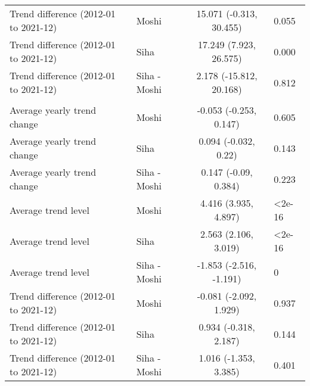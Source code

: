 \begin{longtable}{l|lcl}
Trend difference (2012-01 to 2021-12) & Moshi & 15.071 (-0.313, 30.455) & 0.055 \\ 
Trend difference (2012-01 to 2021-12) & Siha & 17.249 (7.923, 26.575) & 0.000 \\ 
Trend difference (2012-01 to 2021-12) & Siha - Moshi & 2.178 (-15.812, 20.168) & 0.812 \\ 
\midrule\addlinespace[2.5pt]
\multicolumn{4}{l}{No. rain days} \\ 
\midrule\addlinespace[2.5pt]
Average yearly trend change & Moshi & -0.053 (-0.253, 0.147) & 0.605 \\ 
Average yearly trend change & Siha & 0.094 (-0.032, 0.22) & 0.143 \\ 
Average yearly trend change & Siha - Moshi & 0.147 (-0.09, 0.384) & 0.223 \\ 
Average trend level & Moshi & 4.416 (3.935, 4.897) & <2e-16 \\ 
Average trend level & Siha & 2.563 (2.106, 3.019) & <2e-16 \\ 
Average trend level & Siha - Moshi & -1.853 (-2.516, -1.191) & 0 \\ 
Trend difference (2012-01 to 2021-12) & Moshi & -0.081 (-2.092, 1.929) & 0.937 \\ 
Trend difference (2012-01 to 2021-12) & Siha & 0.934 (-0.318, 2.187) & 0.144 \\ 
Trend difference (2012-01 to 2021-12) & Siha - Moshi & 1.016 (-1.353, 3.385) & 0.401 \\ 
\bottomrule
\end{longtable}

